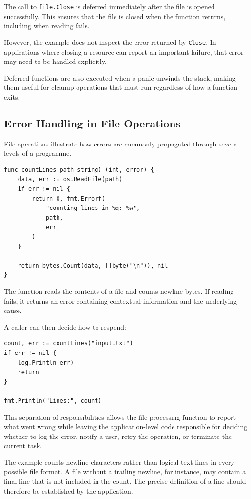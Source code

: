 The call to \texttt{file.Close} is deferred immediately after the file is opened successfully. This ensures that the file is closed when the function returns, including when reading fails.

However, the example does not inspect the error returned by \texttt{Close}. In applications where closing a resource can report an important failure, that error may need to be handled explicitly.

Deferred functions are also executed when a panic unwinds the stack, making them useful for cleanup operations that must run regardless of how a function exits.

\subsection{Error Handling in File Operations}

File operations illustrate how errors are commonly propagated through several levels of a programme.

\begin{lstlisting}
func countLines(path string) (int, error) {
    data, err := os.ReadFile(path)
    if err != nil {
        return 0, fmt.Errorf(
            "counting lines in %q: %w",
            path,
            err,
        )
    }

    return bytes.Count(data, []byte("\n")), nil
}
\end{lstlisting}

The function reads the contents of a file and counts newline bytes. If reading fails, it returns an error containing contextual information and the underlying cause.

A caller can then decide how to respond:

\begin{lstlisting}
count, err := countLines("input.txt")
if err != nil {
    log.Println(err)
    return
}

fmt.Println("Lines:", count)
\end{lstlisting}

This separation of responsibilities allows the file-processing function to report what went wrong while leaving the application-level code responsible for deciding whether to log the error, notify a user, retry the operation, or terminate the current task.

The example counts newline characters rather than logical text lines in every possible file format. A file without a trailing newline, for instance, may contain a final line that is not included in the count. The precise definition of a line should therefore be established by the application.

